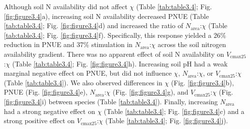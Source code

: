     Although soil N availability did not affect $\chi$ (Table \ref{tab:table3.4}; Fig. \ref{fig:figure3.4}a), increasing soil N availability decreased PNUE (Table \ref{tab:table3.4}; Fig. \ref{fig:figure3.4}d) and increased the ratio of $N_\mathrm{area}$:$\chi$ (Table \ref{tab:table3.4}; Fig. \ref{fig:figure3.4}f). Specifically, this response yielded a 26\% reduction in PNUE and 37\% stimulation in $N_\mathrm{area}$:$\chi$ across the soil nitrogen availability gradient. There was no apparent effect of soil N availability on $V_\mathrm{cmax25}$:$\chi$ (Table \ref{tab:table3.4}; Fig. \ref{fig:figure3.4}h). Increasing soil pH had a weak marginal negative effect on PNUE, but did not influence $\chi$, $N_\mathrm{area}$:$\chi$, or $V_\mathrm{cmax25}$:$\chi$ (Table \ref{tab:table3.4}). We also observed differences in $\chi$ (Fig. \ref{fig:figure3.4}b), PNUE (Fig. \ref{fig:figure3.4}e), $N_\mathrm{area}$:$\chi$ (Fig. \ref{fig:figure3.4}g), and $V_\mathrm{cmax25}$:$\chi$ (Fig. \ref{fig:figure3.4}i) between species (Table \ref{tab:table3.4}). Finally, increasing $N_\mathrm{area}$ had a strong negative effect on $\chi$ (Table \ref{tab:table3.4}; Fig. \ref{fig:figure3.4}c) and a strong positive effect on $V_\mathrm{cmax25}$:$\chi$ (Table \ref{tab:table3.4}; Fig. \ref{fig:figure3.4}j).
    \clearpage

